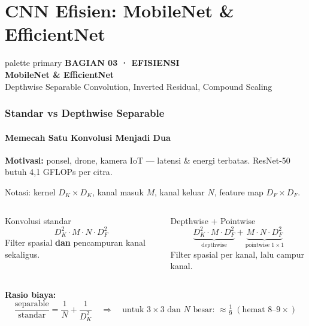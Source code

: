 \documentclass[t,aspectratio=169,xcolor=dvipsnames]{beamer}
\newcommand{\bagian}[3]{%
\begin{frame}[plain]
  \begin{beamercolorbox}[wd=\paperwidth,ht=\paperheight,sep=1.5cm]{palette primary}
    \vspace{1.5cm}
    {\scriptsize\bfseries\color{dlMute}#1}\\[0.4cm]
    {\Huge\bfseries #2}\\[0.4cm]
    {\small\color{dlHairline}#3}
    \vfill
  \end{beamercolorbox}
\end{frame}}
\begin{document}
\section{CNN Efisien: MobileNet \& EfficientNet}
\bagian{BAGIAN 03 · EFISIENSI}{MobileNet \& EfficientNet}{Depthwise Separable Convolution, Inverted Residual, Compound Scaling}

\begin{frame}
    \frametitle{Standar vs Depthwise Separable}
    \framesubtitle{Memecah Satu Konvolusi Menjadi Dua}
    \footnotesize

    \textbf{Motivasi:} ponsel, drone, kamera IoT --- latensi \& energi terbatas. ResNet-50 butuh 4,1 GFLOPs per citra.

    \vspace{0.1cm}
    Notasi: kernel $D_K\times D_K$, kanal masuk $M$, kanal keluar $N$, feature map $D_F\times D_F$.
    \begin{columns}[T]
        \begin{block}{Konvolusi standar}
            $$D_K^2 \cdot M \cdot N \cdot D_F^2$$
            Filter spasial \textbf{dan} pencampuran kanal sekaligus.
        \end{block}

        \begin{exampleblock}{Depthwise + Pointwise}
            $$\underbrace{D_K^2 \cdot M \cdot D_F^2}_{\text{depthwise}} + \underbrace{M \cdot N \cdot D_F^2}_{\text{pointwise } 1\times1}$$
            Filter spasial per kanal, lalu campur kanal.
        \end{exampleblock}
    \end{columns}
    \vspace{0.2cm}
    \textbf{Rasio biaya:}
    $$\frac{\text{separable}}{\text{standar}} = \frac{1}{N} + \frac{1}{D_K^2} \quad\Rightarrow\quad \text{untuk } 3\times3 \text{ dan } N \text{ besar: } \approx \tfrac{1}{9} \;(\text{hemat } 8\text{--}9\times)$$
\end{frame}
\end{document}
